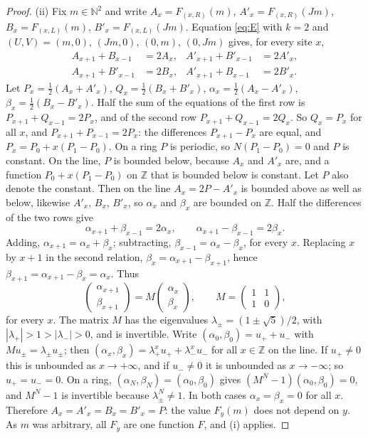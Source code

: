 \begin{proof}
(ii) Fix $m\in\mathbb{N}^2$ and write $A_x=F_{(x,R)}(m)$, $A'_x=F_{(x,R)}(Jm)$, $B_x=F_{(x,L)}(m)$, $B'_x=F_{(x,L)}(Jm)$. Equation \eqref{eq:E} with $k=2$ and $(U,V)=(m,0)$, $(Jm,0)$, $(0,m)$, $(0,Jm)$ gives, for every site $x$,
\begin{align*}
A_{x+1}+B_{x-1}&=2A_x, & A'_{x+1}+B'_{x-1}&=2A'_x,\\
A_{x+1}+B'_{x-1}&=2B_x, & A'_{x+1}+B_{x-1}&=2B'_x .
\end{align*}
Let $P_x=\tfrac12(A_x+A'_x)$, $Q_x=\tfrac12(B_x+B'_x)$, $\alpha_x=\tfrac12(A_x-A'_x)$, $\beta_x=\tfrac12(B_x-B'_x)$. Half the sum of the equations of the first row is $P_{x+1}+Q_{x-1}=2P_x$, and of the second row $P_{x+1}+Q_{x-1}=2Q_x$. So $Q_x=P_x$ for all $x$, and $P_{x+1}+P_{x-1}=2P_x$: the differences $P_{x+1}-P_x$ are equal, and $P_x=P_0+x(P_1-P_0)$. On a ring $P$ is periodic, so $N(P_1-P_0)=0$ and $P$ is constant. On the line, $P$ is bounded below, because $A_x$ and $A'_x$ are, and a function $P_0+x(P_1-P_0)$ on $\mathbb{Z}$ that is bounded below is constant. Let $P$ also denote the constant. Then on the line $A_x=2P-A'_x$ is bounded above as well as below, likewise $A'_x$, $B_x$, $B'_x$, so $\alpha_x$ and $\beta_x$ are bounded on $\mathbb{Z}$. Half the differences of the two rows give
\[
\alpha_{x+1}+\beta_{x-1}=2\alpha_x,\qquad \alpha_{x+1}-\beta_{x-1}=2\beta_x .
\]
Adding, $\alpha_{x+1}=\alpha_x+\beta_x$; subtracting, $\beta_{x-1}=\alpha_x-\beta_x$, for every $x$. Replacing $x$ by $x+1$ in the second relation, $\beta_x=\alpha_{x+1}-\beta_{x+1}$, hence $\beta_{x+1}=\alpha_{x+1}-\beta_x=\alpha_x$. Thus
\[
\begin{pmatrix}\alpha_{x+1}\\ \beta_{x+1}\end{pmatrix}=M\begin{pmatrix}\alpha_x\\ \beta_x\end{pmatrix},\qquad M=\begin{pmatrix}1&1\\1&0\end{pmatrix},
\]
for every $x$. The matrix $M$ has the eigenvalues $\lambda_\pm=(1\pm\sqrt5)/2$, with $|\lambda_+|>1>|\lambda_-|>0$, and is invertible. Write $(\alpha_0,\beta_0)=u_++u_-$ with $Mu_\pm=\lambda_\pm u_\pm$; then $(\alpha_x,\beta_x)=\lambda_+^xu_++\lambda_-^xu_-$ for all $x\in\mathbb{Z}$ on the line. If $u_+\ne0$ this is unbounded as $x\to+\infty$, and if $u_-\ne0$ it is unbounded as $x\to-\infty$; so $u_+=u_-=0$. On a ring, $(\alpha_N,\beta_N)=(\alpha_0,\beta_0)$ gives $(M^N-1)(\alpha_0,\beta_0)=0$, and $M^N-1$ is invertible because $\lambda_\pm^N\ne1$. In both cases $\alpha_x=\beta_x=0$ for all $x$. Therefore $A_x=A'_x=B_x=B'_x=P$: the value $F_y(m)$ does not depend on $y$. As $m$ was arbitrary, all $F_y$ are one function $F$, and (i) applies.


\end{proof}
